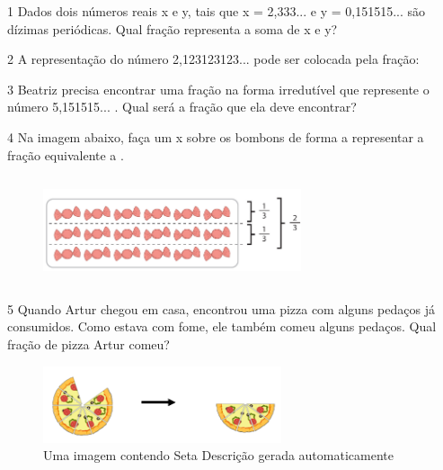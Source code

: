\begin{escolha}
\num{1} Dados dois números reais x e y, tais que x = 2,333... e y =
0,151515... são dízimas periódicas. Qual fração representa a soma de x
e y?

\begin{largebox}
\end{largebox}

\num{2} A representação do número 2,123123123... pode ser colocada pela
fração:

\begin{boxmedio}
\end{boxmedio}

\num{3} Beatriz precisa encontrar uma fração na forma irredutível que
represente o número 5,151515... . Qual será a fração que ela deve
encontrar?

\begin{boxmedio}
\end{boxmedio}

\num{4} Na imagem abaixo, faça um x sobre os bombons de forma a
representar a fração equivalente a .

\begin{figure}
\centering
\includegraphics[width=2.9871in,height=1.23958in]{./_SAEB_9_MAT/media/image43.png}
\end{figure}

\num{5} Quando Artur chegou em casa, encontrou uma pizza com alguns pedaços
já consumidos. Como estava com fome, ele também comeu alguns pedaços.
Qual fração de pizza Artur comeu?

\begin{figure}
\centering
\includegraphics[width=2.75521in,height=0.88894in]{./_SAEB_9_MAT/media/image45.png}
\caption{Uma imagem contendo Seta Descrição gerada automaticamente}
\end{figure}


\end{escolha}

